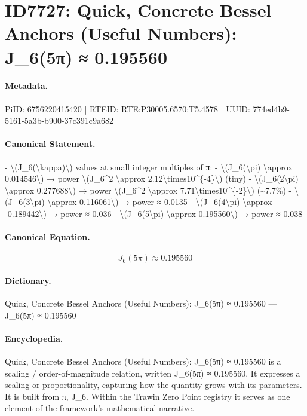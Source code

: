 \section*{ID7727: Quick, Concrete Bessel Anchors (Useful Numbers): J\_6(5π) ≈ 0.195560}
\paragraph{Metadata.}
PiID: 6756220415420 | RTEID: RTE:P30005.6570:T5.4578 | UUID: 774ed4b9-5161-5a3b-b900-37c391c9a682

\paragraph{Canonical Statement.}
- \textbackslash{}(J\_6(\textbackslash{}kappa)\textbackslash{}) values at small integer multiples of π: - \textbackslash{}(J\_6(\textbackslash{}pi) \textbackslash{}approx 0.014546\textbackslash{}) → power \textbackslash{}(J\_6\textasciicircum{}2 \textbackslash{}approx 2.12\textbackslash{}times10\textasciicircum{}\{-4\}\textbackslash{}) (tiny) - \textbackslash{}(J\_6(2\textbackslash{}pi) \textbackslash{}approx 0.277688\textbackslash{}) → power \textbackslash{}(J\_6\textasciicircum{}2 \textbackslash{}approx 7.71\textbackslash{}times10\textasciicircum{}\{-2\}\textbackslash{}) (\textasciitilde{}7.7\%) - \textbackslash{}(J\_6(3\textbackslash{}pi) \textbackslash{}approx 0.116061\textbackslash{}) → power ≈ 0.0135 - \textbackslash{}(J\_6(4\textbackslash{}pi) \textbackslash{}approx -0.189442\textbackslash{}) → power ≈ 0.036 - \textbackslash{}(J\_6(5\textbackslash{}pi) \textbackslash{}approx 0.195560\textbackslash{}) → power ≈ 0.038

\paragraph{Canonical Equation.}
\[
J_6(5\pi) \approx 0.195560
\]

\paragraph{Dictionary.}
Quick, Concrete Bessel Anchors (Useful Numbers): J\_6(5π) ≈ 0.195560 — J\_6(5π) ≈ 0.195560

\paragraph{Encyclopedia.}
Quick, Concrete Bessel Anchors (Useful Numbers): J\_6(5π) ≈ 0.195560 is a scaling / order-of-magnitude relation, written J\_6(5π) ≈ 0.195560. It expresses a scaling or proportionality, capturing how the quantity grows with its parameters. It is built from π, J\_6. Within the Trawin Zero Point registry it serves as one element of the framework's mathematical narrative.
